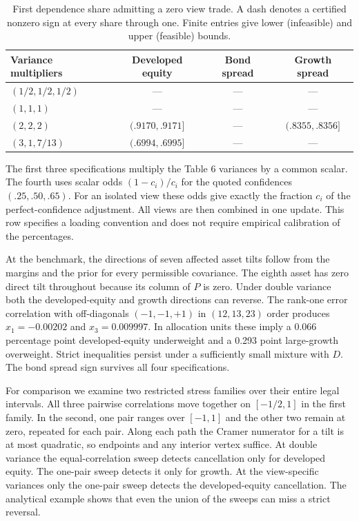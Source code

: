 \documentclass[11pt]{article}
\begin{document}
\begin{table}[ht]
\centering
\caption{First dependence share admitting a zero view trade. A dash denotes a certified nonzero sign at every share through one. Finite entries give lower (infeasible) and upper (feasible) bounds.}
\begin{tabular}{lccc}\toprule
Variance multipliers & Developed equity & Bond spread & Growth spread\\\midrule
$(1/2,1/2,1/2)$ & --- & --- & ---\\
$(1,1,1)$ & --- & --- & ---\\
$(2,2,2)$ & $(.9170,.9171]$ & --- & $(.8355,.8356]$\\
$(3,1,7/13)$ & $(.6994,.6995]$ & --- & ---\\\bottomrule
\end{tabular}
\end{table}

The first three specifications multiply the Table 6 variances by a common scalar. The fourth uses scalar odds $(1-c_i)/c_i$ for the quoted confidences $(.25,.50,.65)$. For an isolated view these odds give exactly the fraction $c_i$ of the perfect-confidence adjustment. All views are then combined in one update. This row specifies a loading convention and does not require empirical calibration of the percentages.

At the benchmark, the directions of seven affected asset tilts follow from the margins and the prior for every permissible covariance. The eighth asset has zero direct tilt throughout because its column of $P$ is zero. Under double variance both the developed-equity and growth directions can reverse. The rank-one error correlation with off-diagonals $(-1,-1,+1)$ in $(12,13,23)$ order produces $x_1=-0.00202$ and $x_3=0.009997$. In allocation units these imply a 0.066 percentage point developed-equity underweight and a 0.293 point large-growth overweight. Strict inequalities persist under a sufficiently small mixture with $D$. The bond spread sign survives all four specifications.

For comparison we examine two restricted stress families over their entire legal intervals. All three pairwise correlations move together on $[-1/2,1]$ in the first family. In the second, one pair ranges over $[-1,1]$ and the other two remain at zero, repeated for each pair. Along each path the Cramer numerator for a tilt is at most quadratic, so endpoints and any interior vertex suffice. At double variance the equal-correlation sweep detects cancellation only for developed equity. The one-pair sweep detects it only for growth. At the view-specific variances only the one-pair sweep detects the developed-equity cancellation. The analytical example shows that even the union of the sweeps can miss a strict reversal.
\end{document}
